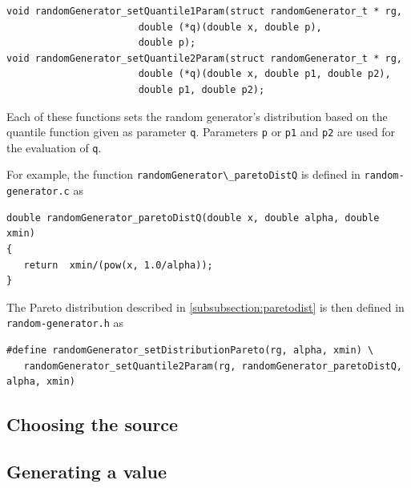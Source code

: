 \begin{verbatim}
void randomGenerator_setQuantile1Param(struct randomGenerator_t * rg,
				       double (*q)(double x, double p),
				       double p);
void randomGenerator_setQuantile2Param(struct randomGenerator_t * rg,
				       double (*q)(double x, double p1, double p2),
				       double p1, double p2);
\end{verbatim}

   Each of these functions sets the random generator's distribution
based on the quantile function given as parameter
\lstinline!q!. Parameters \lstinline!p! or \lstinline !p1! and
\lstinline!p2! are used for the evaluation of \lstinline!q!.

   For example, the function \lstinline!randomGenerator\_paretoDistQ!
is defined in \lstinline!random-generator.c! as 

\begin{verbatim}
double randomGenerator_paretoDistQ(double x, double alpha, double xmin)
{
   return  xmin/(pow(x, 1.0/alpha));
}
\end{verbatim}

   The Pareto distribution described in \ref{subsubsection:paretodist}
is then defined in \lstinline!random-generator.h! as 

\begin{verbatim}
#define randomGenerator_setDistributionPareto(rg, alpha, xmin) \
   randomGenerator_setQuantile2Param(rg, randomGenerator_paretoDistQ, alpha, xmin)
\end{verbatim}

%
\subsection{Choosing the source}

%
\subsection{Generating a value}



